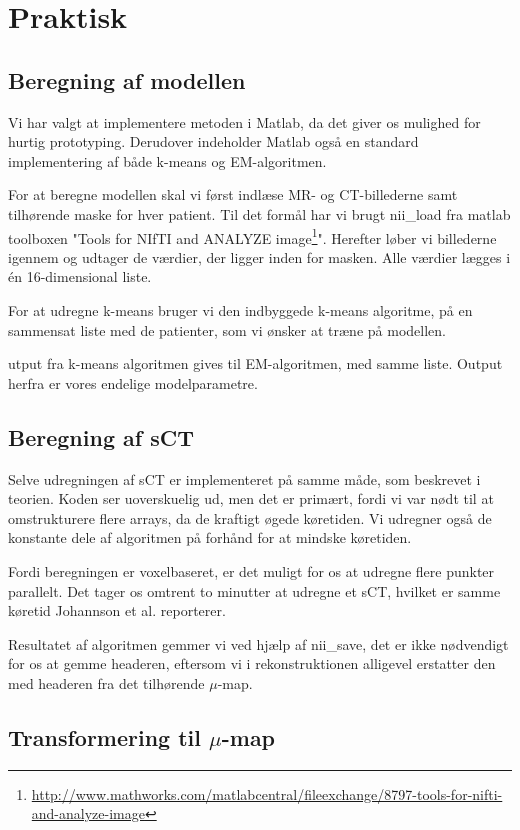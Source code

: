 \section{Praktisk}

\subsection{Beregning af modellen}

Vi har valgt at implementere metoden i Matlab, da det giver os mulighed
for hurtig prototyping. Derudover indeholder Matlab også en standard
implementering af både k-means og EM-algoritmen.

For at beregne modellen skal vi først indlæse MR- og CT-billederne
samt tilhørende maske for hver patient. Til det formål har vi brugt
nii\_load fra matlab toolboxen "Tools for NIfTI and ANALYZE
image\footnote{\url{http://www.mathworks.com/matlabcentral/fileexchange/8797-tools-for-nifti-and-analyze-image}}".
Herefter løber vi billederne igennem og udtager de værdier, der ligger
inden for masken. Alle værdier lægges i én 16-dimensional liste.

For at udregne k-means bruger vi den indbyggede k-means algoritme, på
en sammensat liste med de patienter, som vi ønsker at træne på
modellen.

utput fra k-means algoritmen gives til EM-algoritmen, med samme liste. Output herfra er vores endelige modelparametre.

\subsection{Beregning af sCT}

Selve udregningen af sCT er implementeret på samme måde, som beskrevet i
teorien. Koden ser uoverskuelig ud, men det er primært, fordi
vi var nødt til at omstrukturere flere arrays, da de kraftigt øgede køretiden. Vi udregner også de konstante dele
af algoritmen på forhånd for at mindske køretiden.

Fordi beregningen er voxelbaseret, er det muligt for os at udregne flere
punkter parallelt. Det tager os omtrent to minutter at udregne et sCT,
hvilket er samme køretid Johannson et al. reporterer.

Resultatet af algoritmen gemmer vi ved hjælp af nii\_save, det er ikke
nødvendigt for os at gemme headeren, eftersom vi i rekonstruktionen
alligevel erstatter den med headeren fra det tilhørende $\mu$-map.

\subsection{Transformering til \texorpdfstring{$\mu$}{u}-map} 

